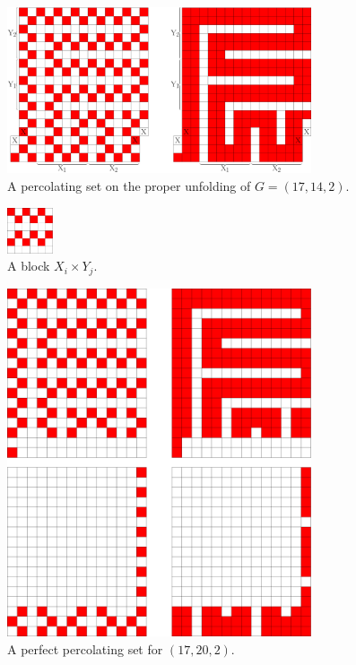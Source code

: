 \begin{figure}[]
\centering
\includegraphics[width=0.8\textwidth]{figures/7/18x16x1_unfolded_lethal.pdf}
\caption{A percolating set on the proper unfolding of $G= (17,14,2)$.}
\label{fig:18x16x1_unfolded_lethal}
\end{figure}

\begin{figure}[]
\centering
\includegraphics[width=0.12\textwidth]{figures/7/XiYj.pdf}
\caption{A block $X_i \times Y_j$.}
\label{fig:XiYj}
\end{figure} 

\begin{figure}[]
\centering
\includegraphics[width=0.8\textwidth]{figures/7/17x14x2.pdf}
\caption{A perfect percolating set for $(17,20,2)$.}
\label{fig:11x20x2}
\end{figure} 

